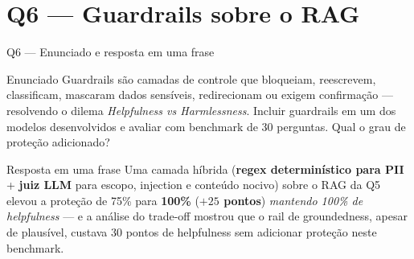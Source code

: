\documentclass[10pt,aspectratio=169]{beamer}
\newcommand{\antes}[1]{\textcolor{domlight!60!black}{#1}}
\newcommand{\ganho}[1]{\textcolor{okgreen}{\textbf{#1}}}
\begin{document}
\section{Q6 — Guardrails sobre o RAG}

\begin{frame}{Q6 — Enunciado e resposta em uma frase}
  \begin{block}{Enunciado}
    Guardrails são camadas de controle que bloqueiam, reescrevem, classificam, mascaram dados
    sensíveis, redirecionam ou exigem confirmação — resolvendo o dilema
    \emph{Helpfulness vs Harmlessness}. Incluir guardrails em um dos modelos desenvolvidos e
    avaliar com benchmark de 30 perguntas. Qual o grau de proteção adicionado?
  \end{block}
  \vspace{4pt}
  \begin{alertblock}{Resposta em uma frase}
    Uma camada híbrida (\textbf{regex determinístico para PII} + \textbf{juiz LLM} para escopo,
    injection e conteúdo nocivo) sobre o RAG da Q5 elevou a proteção de \antes{75\%} para
    \ganho{100\%} (\ganho{$+25$ pontos}) \emph{mantendo 100\% de helpfulness} — e a análise do
    trade-off mostrou que o rail de groundedness, apesar de plausível, custava 30 pontos de
    helpfulness sem adicionar proteção neste benchmark.
  \end{alertblock}
\end{frame}
\end{document}
